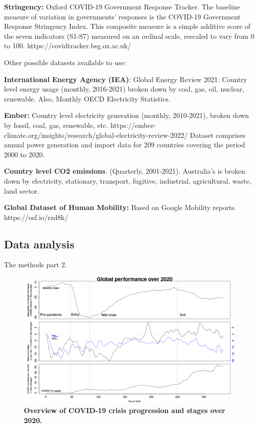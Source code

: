 \documentclass[preprint,12pt]{elsarticle}
\begin{document}
\textbf{Stringency: } Oxford COVID-19 Government Response Tracker. The baseline measure of variation in governments' responses is the COVID-19 Government Response Stringency Index. This composite measure is a simple additive score of the seven indicators (S1-S7) measured on an ordinal scale, rescaled to vary from 0 to 100.
https://covidtracker.bsg.ox.ac.uk/


Other possible datasets available to use:

\textbf{International Energy Agency (IEA)}: Global Energy Review 2021. 
Country level energy usage (monthly, 2016-2021) broken down by coal, gas, oil, nuclear, renewable.
Also, Monthly OECD Electricity Statistics. 

\textbf{Ember:} Country level electricity generation (monthly, 2010-2021), broken down by fossil, coal, gas, renewable, etc.
https://ember-climate.org/insights/research/global-electricity-review-2022/
Dataset comprises annual power generation and import data for 209 countries covering the period 2000 to 2020. 

\textbf{Country level CO2 emissions}. (Quarterly, 2001-2021). Australia's is broken down by electricity, stationary, transport, fugitive, industrial, agricultural, waste, land sector.

\textbf{Global Dataset of Human Mobility:} Based on Google Mobility reports.
https://osf.io/rzd8k/




\subsection*{Data analysis}
The methods part 2.

\begin{figure}
\centering
\includegraphics[trim={0 0 15 22},clip,scale=0.45]{Images/LancetPHOverall.png}
\caption{\bf Overview of COVID-19 crisis progression and stages over 2020.}
 \label{fig:stages}
\end{figure}
\end{document}
